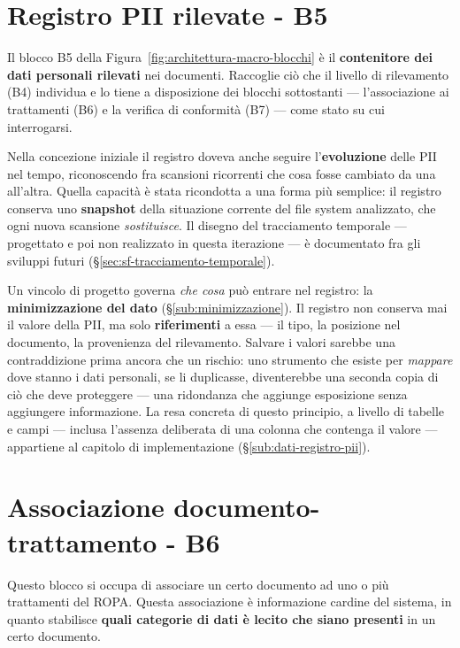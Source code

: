 \section{Registro PII rilevate - B5}
\label{sec:b5-DB-PII}

Il blocco B5 della Figura~\ref{fig:architettura-macro-blocchi} è il \textbf{contenitore dei dati personali rilevati} nei documenti. Raccoglie ciò che il livello di rilevamento (B4) individua e lo tiene a disposizione dei blocchi sottostanti --- l'associazione ai trattamenti (B6) e la verifica di conformità (B7) --- come stato su cui interrogarsi.

Nella concezione iniziale il registro doveva anche seguire l'\textbf{evoluzione} delle PII nel tempo, riconoscendo fra scansioni ricorrenti che cosa fosse cambiato da una all'altra. Quella capacità è stata ricondotta a una forma più semplice: il registro conserva uno \textbf{snapshot} della situazione corrente del file system analizzato, che ogni nuova scansione \emph{sostituisce}. Il disegno del tracciamento temporale --- progettato e poi non realizzato in questa iterazione --- è documentato fra gli sviluppi futuri (§\ref{sec:sf-tracciamento-temporale}).

Un vincolo di progetto governa \emph{che cosa} può entrare nel registro: la \textbf{minimizzazione del dato} (§\ref{sub:minimizzazione}). Il registro non conserva mai il valore della PII, ma solo \textbf{riferimenti} a essa --- il tipo, la posizione nel documento, la provenienza del rilevamento. Salvare i valori sarebbe una contraddizione prima ancora che un rischio: uno strumento che esiste per \emph{mappare} dove stanno i dati personali, se li duplicasse, diventerebbe una seconda copia di ciò che deve proteggere --- una ridondanza che aggiunge esposizione senza aggiungere informazione. La resa concreta di questo principio, a livello di tabelle e campi --- inclusa l'assenza deliberata di una colonna che contenga il valore --- appartiene al capitolo di implementazione (§\ref{sub:dati-registro-pii}).

\section{Associazione documento-trattamento - B6}
\label{sec:b6-documento-trattamento}
Questo blocco si occupa di associare un certo documento ad uno o più trattamenti del ROPA. Questa associazione è informazione cardine del sistema, in quanto stabilisce \textbf{quali categorie di dati è lecito che siano presenti} in un certo documento.

